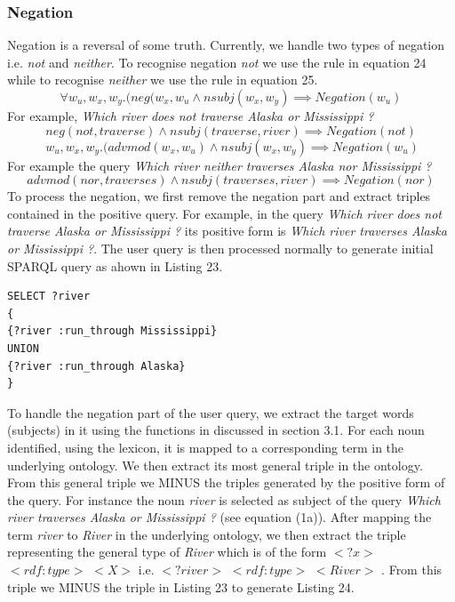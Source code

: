 \documentclass[review]{elsarticle}
\begin{document}
\subsubsection{Negation}
Negation is a reversal of some truth. Currently, we handle two types of negation i.e. \textit{not} and \textit{neither}. To recognise negation \textit{not}  we use the rule in equation 24 while to recognise \textit{neither} we use the rule in equation 25.
\begin{equation}
 \forall  w_u,w_x,w_y.(neg(w_x,w_u\land nsubj(w_x,w_y)\implies Negation(w_u)
\end{equation}
For example, \textit{Which river does not traverse Alaska or Mississippi ?}
\begin{equation*}
 neg(not, traverse)\land nsubj(traverse,river)\implies Negation(not)
 \end{equation*}
\begin{equation}
 \ w_u,w_x,w_y.(advmod(w_x,w_u)\land nsubj(w_x,w_y)\implies Negation(w_u)
\end{equation}
For example the query \textit{Which river neither traverses Alaska nor Mississippi ?}
\begin{equation*}
 advmod(nor, traverses)\land nsubj(traverses,river)\implies Negation(nor)
 \end{equation*}
To process the negation,  we first remove the negation part and  extract triples  contained in the positive query. For example, in the query \textit{Which river does not traverse Alaska or Mississippi ?} its positive form is \textit{Which river  traverses Alaska or Mississippi ?}.  The user query is then processed normally to generate initial SPARQL query as ahown in Listing 23.
 
 \begin{lstlisting}[caption= initial listing for negation example]
SELECT ?river 
{
{?river :run_through Mississippi}
UNION
{?river :run_through Alaska}
}
\end{lstlisting}
To handle the negation part of the user query, we extract the target words (subjects)  in it using the functions in discussed in section 3.1.  For each noun identified, using the lexicon, it is mapped to a corresponding  term in the underlying ontology. We then extract its most general triple in the ontology.  From this  general triple we MINUS the triples generated by the positive form of the query. For instance the noun \textit{river}
is selected as subject of the query  \textit{Which river  traverses Alaska or Mississippi ?} (see equation (1a)). After mapping the term  \textit{river} to \textit{River} in the underlying ontology, we then extract the  triple representing the general type of \textit{River} which is of the form   $<?x>$ $<rdf:type>$ $<X>$ i.e. $<?river>$ $<rdf:type>$ $<River>$ . From this triple we MINUS the triple in Listing 23 to generate Listing 24.
 
\end{document}

